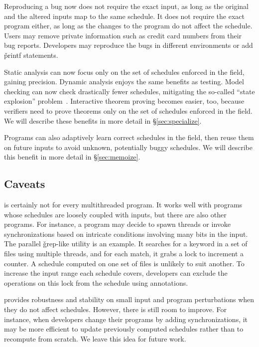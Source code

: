 Reproducing a bug now does not require the exact input,
as long as the original and the altered inputs map to the same schedule.
It does not require the exact program either, as long as the changes to
the program do not affect the schedule.  Users may remove private
information such as credit card numbers from their bug reports. Developers
may reproduce the bugs in different environments or add \v{printf}
statements.

 Static analysis can now focus
only on the set of schedules enforced in the field, gaining
precision.  Dynamic analysis enjoys the same benefits as testing.  Model
checking can now check drastically fewer schedules, mitigating the so-called
``state explosion'' problem~\cite{clarke:ModelChecking}.  Interactive theorem proving becomes easier, too,
because verifiers need to prove theorems only on the set of schedules
enforced in the field.  We will describe these benefits in more detail in
\S\ref{sec:specialize}.

  Programs can also adaptively learn correct
schedules in the field, then reuse them on future inputs to avoid unknown,
potentially buggy schedules.  We will describe this benefit in more
detail in \S\ref{sec:memoize}.

\subsection{Caveats}

\smt is certainly not for every multithreaded program.  It works well with
programs whose schedules are loosely coupled with inputs,
but there are also other programs.  For instance, a program may decide to spawn
threads or invoke synchronizations based on intricate conditions involving many bits in the input.
The parallel \v{grep}-like utility \pfscan is an example.  It searches for a
keyword in a set of files using multiple threads, and for each match, it
grabs a lock to increment a counter.  A schedule computed on one set of
files is unlikely to suit another.
To increase the input range each schedule covers, developers can
exclude the operations on this lock from the schedule using annotations.


\smt provides robustness and stability on small input and program
perturbations when they do not affect schedules.  However, there
is still room to improve.  For instance, when developers change their
programs by adding synchronizations, it may be more efficient to
update previously computed schedules rather than to recompute from
scratch. We leave this idea for future work.

